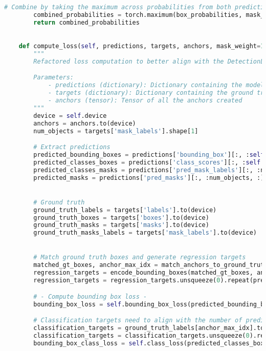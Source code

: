 \begin{lstlisting}[language=Python, caption=Extended Masked-Attention Mask Transformer Model Class]
        # Combine by taking the maximum across probabilities from both predictions
        combined_probabilities = torch.maximum(box_probabilities, mask_probabilities)        
        return combined_probabilities

    
    def compute_loss(self, predictions, targets, anchors, mask_weight=1.0, bounding_box_weight=1.0, class_weight=0.5):
        """
        Refactored loss computation to better align with the DetectionLoss class approach.

        Parameters:
            - predictions (dictionary): Dictionary containing the model predictions for bounding boxes, classes and masks
            - targets (dictionary): Dictionary containing the ground truth for bounding boxes, classes and masks
            - anchors (tensor): Tensor of all the anchors created
        """
        device = self.device
        anchors = anchors.to(device)        
        num_objects = targets['mask_labels'].shape[1]

        # Extract predictions
        predicted_bounding_boxes = predictions['bounding_box'][:, :self.num_anchors, :]  
        predicted_classes_boxes = predictions['class_scores'][:, :self.num_anchors, :]
        predicted_classes_masks = predictions['pred_mask_labels'][:, :num_objects, :]
        predicted_masks = predictions['pred_masks'][:, :num_objects, :]


        # Ground truth
        ground_truth_labels = targets['labels'].to(device)
        ground_truth_boxes = targets['boxes'].to(device)
        ground_truth_masks = targets['masks'].to(device)
        ground_truth_masks_labels = targets['mask_labels'].to(device)


        # Match ground truth boxes and generate regression targets
        matched_gt_boxes, anchor_max_idx = match_anchors_to_ground_truth_boxes(anchors, ground_truth_boxes)
        regression_targets = encode_bounding_boxes(matched_gt_boxes, anchors).to(device)
        regression_targets = regression_targets.unsqueeze(0).repeat(predicted_bounding_boxes.size(0), 1, 1)

        # - Compute bounding box loss -
        bounding_box_loss = self.bounding_box_loss(predicted_bounding_boxes, regression_targets)

        # Classification targets need to align with the number of predictions per class and flatten the scores and targets to calculate bounding classification loss
        classification_targets = ground_truth_labels[anchor_max_idx].to(device)
        classification_targets = classification_targets.unsqueeze(0).repeat(predicted_classes_boxes.size(0), 1)
        bounding_box_class_loss = self.class_loss(predicted_classes_boxes.reshape(-1, predicted_classes_boxes.size(-1)), classification_targets.reshape(-1))


\end{lstlisting}
